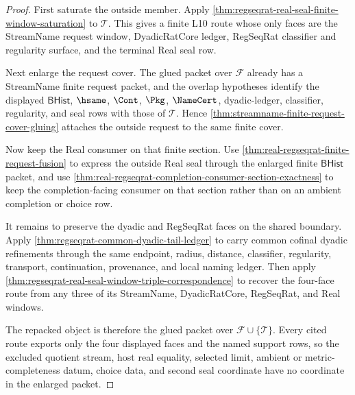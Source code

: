 \begin{proof}
First saturate the outside member. Apply
\autoref{thm:regseqrat-real-seal-finite-window-saturation} to
$\mathcal{T}$. This gives a finite L10 route whose only faces are the
StreamName request window, DyadicRatCore ledger, RegSeqRat classifier and
regularity surface, and the terminal Real seal row.

Next enlarge the request cover. The glued packet over $\mathcal{F}$ already
has a StreamName finite request packet, and the overlap hypotheses identify
the displayed $\mathsf{BHist}$, $\hsame$, $\Cont$, $\Pkg$, $\NameCert$,
dyadic-ledger, classifier, regularity, and seal rows with those of
$\mathcal{T}$. Hence
\autoref{thm:streamname-finite-request-cover-gluing} attaches the outside
request to the same finite cover.

Now keep the Real consumer on that finite section. Use
\autoref{thm:real-regseqrat-finite-request-fusion} to express the outside Real
seal through the enlarged finite $\mathsf{BHist}$ packet, and use
\autoref{thm:real-regseqrat-completion-consumer-section-exactness} to keep the
completion-facing consumer on that section rather than on an ambient completion
or choice row.

It remains to preserve the dyadic and RegSeqRat faces on the shared boundary.
Apply \autoref{thm:regseqrat-common-dyadic-tail-ledger} to carry common cofinal
dyadic refinements through the same endpoint, radius, distance, classifier,
regularity, transport, continuation, provenance, and local naming ledger.
Then apply
\autoref{thm:regseqrat-real-seal-window-triple-correspondence} to recover the
four-face route from any three of its StreamName, DyadicRatCore, RegSeqRat, and
Real windows.

The repacked object is therefore the glued packet over
$\mathcal{F}\cup\{\mathcal{T}\}$. Every cited route exports only the four
displayed faces and the named support rows, so the excluded quotient stream,
host real equality, selected limit, ambient or metric-completeness datum,
choice data, and second seal coordinate have no coordinate in the enlarged
packet.
\end{proof}

